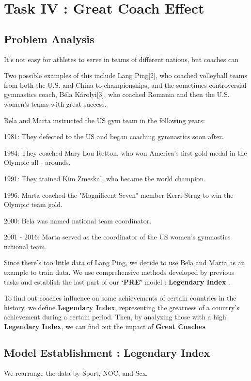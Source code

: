 

\section{Task IV : Great Coach Effect}

\subsection{Problem Analysis}
It's not easy for athletes to serve in teams of different nations, but coaches can

Two possible examples of this include Lang Ping[2],
who coached volleyball teams from both the U.S. and China to championships, and the
sometimes-controversial gymnastics coach, Béla Károlyi[3], who coached Romania and
then the U.S. women's teams with great success. 

Bela and Marta instructed the US gym team in the following years:

1981: They defected to the US and began coaching gymnastics soon after.

1984: They coached Mary Lou Retton, who won America's first gold medal in the Olympic all - arounds.

1991: They trained Kim Zmeskal, who became the world champion.

1996: Marta coached the "Magnificent Seven" member Kerri Strug to win the Olympic team gold.

2000: Bela was named national team coordinator.

2001 - 2016: Marta served as the coordinator of the US women's gymnastics national team.

Since there's too little data of Lang Ping, we decide to use Bela and Marta as an example to train data. We use comprehensive methods developed by previous tasks and establish the last part of our \textbf{`PRE'} model : \textbf{Legendary Index} .

To find out coaches influence on some achievements of certain countries in the history, we define \textbf{Legendary Index}, representing the greatness of a country's achievement during a certain period.
Then, by analyzing those with a high \textbf{Legendary Index}, we can find out the impact of \textbf{Great Coaches}

\subsection{Model Establishment : Legendary Index}
We rearrange the data by Sport, NOC, and Sex. 

